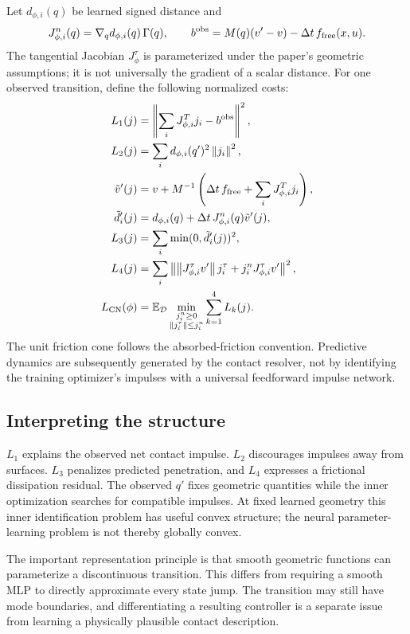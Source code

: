Let $d_{\phi,i}(q)$ be learned signed distance and
\begin{equation}
J^n_{\phi,i}(q)=\nabla_qd_{\phi,i}(q)\,\Gamma(q),\qquad
b^{\rm obs}=M(q)(v'-v)-\Delta t\,f_{\rm free}(x,u).
\end{equation}
The tangential Jacobian $J^\tau_\phi$ is parameterized under the paper's
geometric assumptions; it is not universally the gradient of a scalar distance.
For one observed transition, define the following normalized costs:
\begin{align}
L_1(j)&=\left\lVert\sum_iJ_{\phi,i}^Tj_i-b^{\rm obs}\right\rVert^2,\\
L_2(j)&=\sum_i d_{\phi,i}(q')^2\left\lVert j_i\right\rVert^2,\\
\tilde v'(j)&=v+M^{-1}\left(\Delta t\,f_{\rm free}+\sum_iJ_{\phi,i}^Tj_i\right),\\
\tilde d'_i(j)&=d_{\phi,i}(q)+\Delta t\,J^n_{\phi,i}(q)\tilde v'(j),\\
L_3(j)&=\sum_i\min(0,\tilde d'_i(j))^2,\\
L_4(j)&=\sum_i\left\lVert\left\lVert J^\tau_{\phi,i}v'\right\rVert j_i^\tau+j_i^nJ^\tau_{\phi,i}v'\right\rVert^2,\\
L_{\rm CN}(\phi)&=\mathbb E_{\mathcal D}\min_{\substack{j_i^n\ge0\\\left\lVert j_i^\tau\right\rVert\le j_i^n}}
\sum_{k=1}^{4}L_k(j).
\end{align}
The unit friction cone follows the absorbed-friction convention. Predictive
dynamics are subsequently generated by the contact resolver, not by identifying
the training optimizer's impulses with a universal feedforward impulse network.

\subsection{Interpreting the structure}
$L_1$ explains the observed net contact impulse. $L_2$ discourages impulses
away from surfaces. $L_3$ penalizes predicted penetration, and $L_4$ expresses
a frictional dissipation residual. The observed $q'$ fixes geometric quantities
while the inner optimization searches for compatible impulses. At fixed learned
geometry this inner identification problem has useful convex structure; the
neural parameter-learning problem is not thereby globally convex.

The important representation principle is that smooth geometric functions can
parameterize a discontinuous transition. This differs from requiring a smooth
MLP to directly approximate every state jump. The transition may still have
mode boundaries, and differentiating a resulting controller is a separate issue
from learning a physically plausible contact description.

